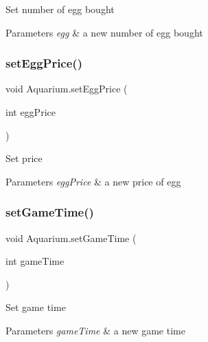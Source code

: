 Set number of egg bought 
\begin{DoxyParams}{Parameters}
{\em egg} & a new number of egg bought \\
\hline
\end{DoxyParams}
\mbox{\label{class_aquarium_aaf8f1dcec2a7a54a2e77931946224181}} 
\subsubsection{\texorpdfstring{set\+Egg\+Price()}{setEggPrice()}}
{\footnotesize\ttfamily void Aquarium.\+set\+Egg\+Price (\begin{DoxyParamCaption}\item[{int}]{egg\+Price }\end{DoxyParamCaption})\hspace{0.3cm}{\ttfamily [inline]}}

Set price 
\begin{DoxyParams}{Parameters}
{\em egg\+Price} & a new price of egg \\
\hline
\end{DoxyParams}
\mbox{\label{class_aquarium_a8717586304a44390ef1d8363ebf2d42e}} 
\subsubsection{\texorpdfstring{set\+Game\+Time()}{setGameTime()}}
{\footnotesize\ttfamily void Aquarium.\+set\+Game\+Time (\begin{DoxyParamCaption}\item[{int}]{game\+Time }\end{DoxyParamCaption})\hspace{0.3cm}{\ttfamily [inline]}}

Set game time 
\begin{DoxyParams}{Parameters}
{\em game\+Time} & a new game time \\
\hline
\end{DoxyParams}
\mbox{\label{class_aquarium_af845b924b868a8897f3d8f2a104e22f7}} 

